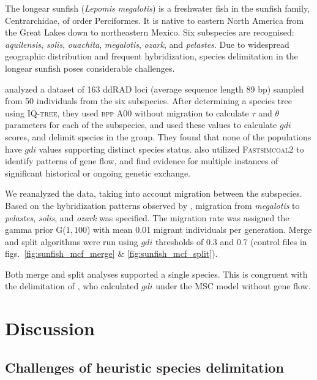 \documentclass{article1}
\newcommand{\red}[1]{{\color{red}{#1}}}
\begin{document}
The longear sunfish (\textit{Lepomis megalotis}) is a freshwater fish in the sunfish
family, Centrarchidae, of order Perciformes.  It is native to eastern North America from
the Great Lakes down to northeastern Mexico.  Six subspecies are recognised:
\textit{aquilensis}, \textit{solis}, \textit{ouachita}, \textit{megalotis},
\textit{ozark}, and \textit{pelastes}.  Due to widespread geographic distribution and
frequent hybridization, species delimitation in the longear sunfish poses considerable
challenges.

\citet{Kim2022} analyzed a dataset of 163 ddRAD loci (average sequence length 89 bp)
sampled from 50 individuals from the six subspecies.  After determining a species tree
using \textsc{IQ-tree}, they used \textsc{bpp} A00 without migration to calculate $\tau$
and $\theta$ parameters for each of the subspecies, and used these values to calculate
$gdi$ scores, and delimit species in the group.  They found that none of the
populations have $gdi$ values supporting distinct species status. \citet{Kim2022}
also utilized \textsc{Fastsimcoal2} to identify patterns of gene flow, and find evidence
for multiple instances of significant historical or ongoing genetic exchange.

We reanalyzed the data, taking into account migration between the subspecies.  Based on
the hybridization patterns observed by \cite{Kim2022}, migration from \textit{megalotis}
to \textit{pelastes}, \textit{solis}, and \textit{ozark} was specified.  The migration
rate was assigned the gamma prior G($1,100$) with mean 0.01 migrant individuals per
generation.  Merge and split algorithms were run using $gdi$ thresholds of 0.3 and
0.7 (control files in figs.~\ref{fig:sunfish_mcf_merge} \& \ref{fig:sunfish_mcf_split}).

Both merge and split analyses supported a single species.  This is congruent with the
delimitation of \citet{Kim2022}, who calculated $gdi$ under the MSC model without
gene flow.  \red{[look at parameter estimates.]}



\section{Discussion}

\subsection{Challenges of heuristic species delimitation}
\end{document}

